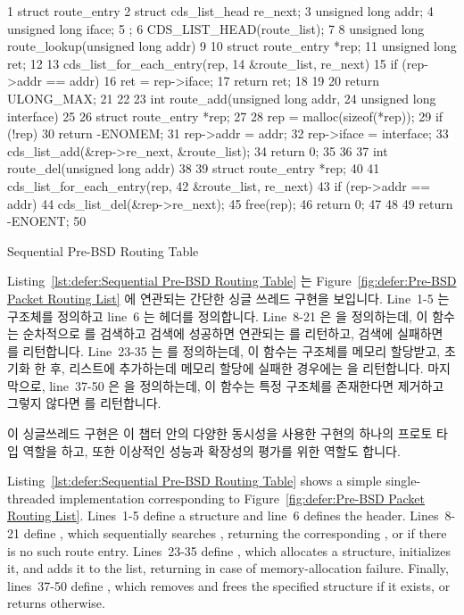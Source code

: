 \begin{listing}[tb]
{ \scriptsize
\begin{verbbox}
 1 struct route_entry {
 2   struct cds_list_head re_next;
 3   unsigned long addr;
 4   unsigned long iface;
 5 };
 6 CDS_LIST_HEAD(route_list);
 7
 8 unsigned long route_lookup(unsigned long addr)
 9 {
10   struct route_entry *rep;
11   unsigned long ret;
12
13   cds_list_for_each_entry(rep,
14                           &route_list, re_next) {
15     if (rep->addr == addr) {
16       ret = rep->iface;
17       return ret;
18     }
19   }
20   return ULONG_MAX;
21 }
22
23 int route_add(unsigned long addr,
24               unsigned long interface)
25 {
26   struct route_entry *rep;
27
28   rep = malloc(sizeof(*rep));
29   if (!rep)
30     return -ENOMEM;
31   rep->addr = addr;
32   rep->iface = interface;
33   cds_list_add(&rep->re_next, &route_list);
34   return 0;
35 }
36
37 int route_del(unsigned long addr)
38 {
39   struct route_entry *rep;
40
41   cds_list_for_each_entry(rep,
42                           &route_list, re_next) {
43     if (rep->addr == addr) {
44       cds_list_del(&rep->re_next);
45       free(rep);
46       return 0;
47     }
48   }
49   return -ENOENT;
50 }
\end{verbbox}
}
\centering
\theverbbox
\caption{Sequential Pre-BSD Routing Table}
\label{lst:defer:Sequential Pre-BSD Routing Table}
\end{listing}

Listing~\ref{lst:defer:Sequential Pre-BSD Routing Table} 는
Figure~\ref{fig:defer:Pre-BSD Packet Routing List} 에 연관되는 간단한 싱글
쓰레드 구현을 보입니다.
Line~1-5 는  구조체를 정의하고 line~6 는  헤더를
정의합니다.
Line~8-21 은  을 정의하는데, 이 함수는 순차적으로
 를 검색하고 검색에 성공하면 연관되는  를 리턴하고,
검색에 실패하면  를 리턴합니다.
Line~23-35 는  를 정의하는데, 이 함수는 
구조체를 메모리 할당받고, 초기화 한 후, 리스트에 추가하는데 메모리 할당에
실패한 경우에는  을 리턴합니다.
마지막으로, line~37-50 은  을 정의하는데, 이 함수는 특정
 구조체를 존재한다면 제거하고 그렇지 않다면  를
리턴합니다.

이 싱글쓰레드 구현은 이 챕터 안의 다양한 동시성을 사용한 구현의 하나의 프로토
타입 역할을 하고, 또한 이상적인 성능과 확장성의 평가를 위한 역할도 합니다.
\iffalse

Listing~\ref{lst:defer:Sequential Pre-BSD Routing Table}
shows a simple single-threaded implementation corresponding to
Figure~\ref{fig:defer:Pre-BSD Packet Routing List}.
Lines~1-5 define a  structure and line~6 defines
the  header.
Lines~8-21 define , which sequentially searches
, returning the corresponding , or
 if there is no such route entry.
Lines~23-35 define , which allocates a
 structure, initializes it, and adds it to the
list, returning  in case of memory-allocation failure.
Finally, lines~37-50 define , which removes and
frees the specified  structure if it exists,
or returns  otherwise.

